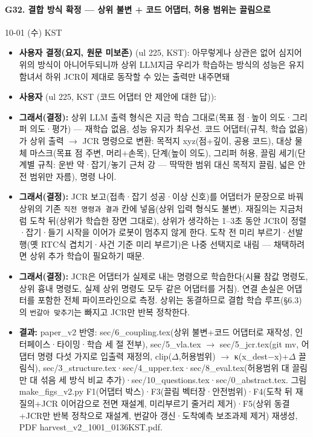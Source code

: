\paragraph{G32. 결합 방식 확정 --- 상위 불변 + 코드 어댑터, 허용 범위는 끌림으로}
{\small 10-01 (수) KST}
\begin{itemize}
  \item \textbf{사용자 결정(요지, 원문 미보존)} (ul 225, KST): 아무렇게나 상관은 없어 심지어 위의 방식이 아니어두되니까 상위 LLM지금 우리가 학습하는 방식의 성능은 유지함녀서 하위 JCR이 제대로 동작할 수 있는 출력만 내주면돼
  \item \textbf{사용자} (ul 225, KST (코드 어댑터 안 제안에 대한 답)): 
  \item \textbf{그래서(결정):} 상위 LLM 출력 형식은 지금 학습 그대로(목표 점·높이 의도·그리퍼 의도·평가) --- 재학습 없음, 성능 유지가 최우선. 코드 어댑터(규칙, 학습 없음)가 상위 출력 $\rightarrow$ JCR 명령으로 변환: 목적지 xyz(점+깊이, 공용 코드), 대상 물체 마스크(목표 점 주변, 머리+손목), 단계(높이 의도), 그리퍼 허용, 끌림 세기(단계별 규칙: 운반 약·잡기/놓기 근처 강 --- 딱딱한 범위 대신 목적지 끌림, 넓은 안전 범위만 자름), 명령 나이.
  \item \textbf{그래서(결정):} JCR 보고(접촉·잡기 성공·이상 신호)를 어댑터가 문장으로 바꿔 상위의 기존 \texttt{직전 명령과 결과} 칸에 넣음(상위 입력 형식도 불변). 재질의는 지금처럼 도착 뒤(상위가 학습한 장면 그대로), 상위가 생각하는 1--3초 동안 JCR이 정렬·잡기·들기 시작을 이어가 로봇이 멈추지 않게 한다. 도착 전 미리 부르기·선발행(옛 RTC식 겹치기·사건 기준 미리 부르기)은 나중 선택지로 내림 --- 채택하려면 상위 추가 학습이 필요하기 때문.
  \item \textbf{그래서(결정):} JCR은 어댑터가 실제로 내는 명령으로 학습한다(시뮬 참값 명령도, 상위 흉내 명령도, 실제 상위 명령도 모두 같은 어댑터를 거침). 연결 손실은 어댑터를 포함한 전체 파이프라인으로 측정. 상위는 동결하므로 결합 학습 루프(§6.3)의 \texttt{번갈아 맞추기}는 빠지고 JCR만 반복 정착한다.
  \item \textbf{결과:} paper\_v2 반영: sec/6\_coupling.tex(상위 불변+코드 어댑터로 재작성, 인터페이스·타이밍·학습 세 절 전부), sec/5\_vla.tex $\rightarrow$ sec/5\_jcr.tex(git mv, 어댑터 명령 다섯 가지로 입출력 재정의, clip($\Delta$,허용범위) $\rightarrow$ κ(x\_dest$-$x)+$\Delta$ 끌림식), sec/3\_structure.tex·sec/4\_upper.tex·sec/8\_eval.tex(허용범위 대 끌림만 대 섞음 세 방식 비교 추가)·sec/10\_questions.tex·sec/0\_abstract.tex. 그림 make\_figs\_v2.py F1(어댑터 박스)·F3(끌림 벡터장·안전범위)·F4(도착 뒤 재질의+JCR 이어감으로 전면 재설계, 미리부르기 줄거리 제거)·F5(상위 동결+JCR만 반복 정착으로 재설계, 번갈아 갱신·도착예측 보조과제 제거) 재생성, PDF harvest\_v2\_1001\_0136KST.pdf.
\end{itemize}

